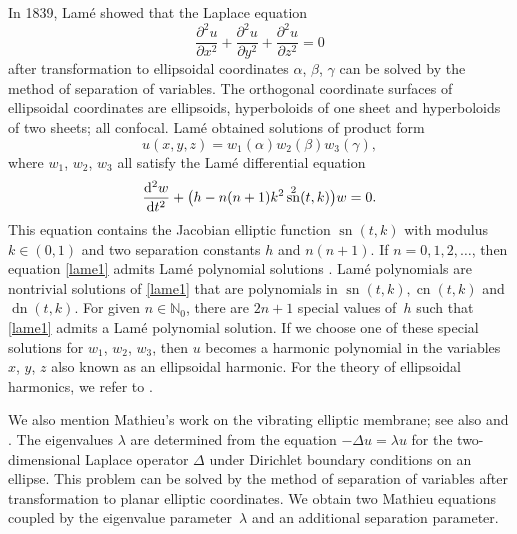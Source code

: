 \documentclass[pdftex]{sigma}
\newcommand{\N}{\mathbb{N}}
\DeclareMathOperator{\sn}{sn}
\DeclareMathOperator{\cn}{cn}
\DeclareMathOperator{\dn}{dn}
\numberwithin{equation}{section}
\begin{document}
In 1839, Lam\'e \cite{L} showed that the Laplace equation
\[ \frac{\partial^2u}{\partial x^2}+\frac{\partial^2 u}{\partial y^2}+\frac{\partial^2 u}{\partial z^2}=0\]
after transformation to ellipsoidal coordinates $\alpha$, $\beta$, $\gamma$ \cite[Section~1.6]{A} can be solved by the method of separation of variables.
The orthogonal coordinate surfaces of ellipsoidal coordinates are ellipsoids, hyperboloids of one sheet and
hyperboloids of two sheets; all confocal.
Lam\'e obtained solutions of product form
\begin{equation*}%
 u(x,y,z)=w_1(\alpha)w_2(\beta)w_3(\gamma),
\end{equation*}
where $w_1$, $w_2$, $w_3$ all satisfy the Lam\'e differential equation
\begin{equation}\label{lame1}
\frac{{\rm d}^2w}{{\rm d}t^2}+\bigl(h-n(n+1)k^2 \sn^2(t,k)\bigr) w=0.
\end{equation}
This equation contains the Jacobian elliptic function $\sn(t,k)$ with modulus $k\in(0,1)$
and two separation constants $h$ and $n(n+1)$.
If $n=0,1,2,\dots$, then equation \eqref{lame1} admits Lam\'e polynomial solutions \cite[Chapter~IX]{A}.
Lam\'e polynomials are nontrivial solutions of \eqref{lame1} that are polynomials in $\sn(t,k), \cn(t,k)$ and $\dn(t,k)$.
For given $n\in\N_0$, there are $2n+1$ special values of~$h$ such that \eqref{lame1} admits a Lam\'e polynomial solution.
If we choose one of these special solutions for $w_1$, $w_2$, $w_3$, then $u$ becomes a harmonic polynomial in the variables $x$, $y$, $z$ also known as an ellipsoidal harmonic.
For the theory of ellipsoidal harmonics, we refer to \cite{D, H, Ho}.

We also mention Mathieu's work \cite{M} on the vibrating elliptic membrane; see also \cite[Section~4.31]{MS} and \cite[p.~4]{Vbook}.
The eigenvalues $\lambda$ are determined from the equation $-\Delta u=\lambda u$ for the two-dimensional Laplace operator $\Delta$ under Dirichlet boundary conditions on an ellipse.
This problem can be solved by the method of separation of variables after transformation to planar elliptic coordinates.
We obtain two Mathieu equations coupled by the eigenvalue parameter~$\lambda$ and an additional separation parameter.
\end{document}
